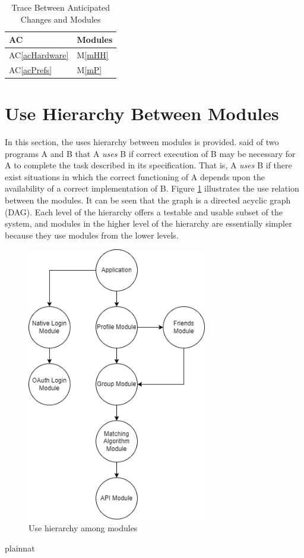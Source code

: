 \documentclass[12pt, titlepage]{article}
\newcommand{\acref}[1]{AC\ref{#1}}
\newcommand{\mref}[1]{M\ref{#1}}
\begin{document}
\begin{table}[H]
\centering
\begin{tabular}{p{} p{}}
\toprule
\textbf{AC} & \textbf{Modules}\\
\midrule
\acref{acHardware} & \mref{mHH}\\
\acref{acPrefs} & \mref{mP}\\
\bottomrule
\end{tabular}
\caption{Trace Between Anticipated Changes and Modules}
\label{TblACT}
\end{table}

\section{Use Hierarchy Between Modules} \label{SecUse}

In this section, the uses hierarchy between modules is
provided. \citet{Parnas1978} said of two programs A and B that A {\em uses} B if
correct execution of B may be necessary for A to complete the task described in
its specification. That is, A {\em uses} B if there exist situations in which
the correct functioning of A depends upon the availability of a correct
implementation of B.  Figure \ref{FigUH} illustrates the use relation between
the modules. It can be seen that the graph is a directed acyclic graph
(DAG). Each level of the hierarchy offers a testable and usable subset of the
system, and modules in the higher level of the hierarchy are essentially simpler
because they use modules from the lower levels.

\begin{figure}[H]
\centering
\includegraphics[width=0.7\textwidth]{UsesHierarchy.png}
\caption{Use hierarchy among modules}
\label{FigUH}
\end{figure}

\newpage


 {plainnat}

\end{document}
